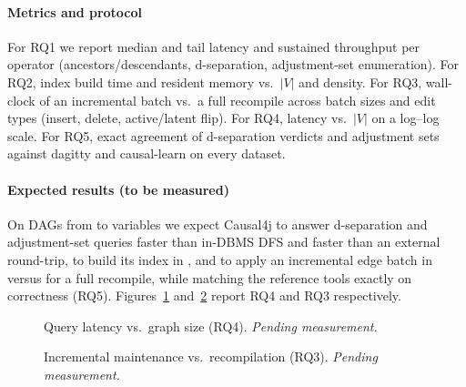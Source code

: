 \paragraph{Metrics and protocol}
For RQ1 we report median and tail latency and sustained throughput per operator
(ancestors/descendants, d-separation, adjustment-set enumeration). For RQ2, index
build time and resident memory vs.\ $|V|$ and density. For RQ3, wall-clock of an
incremental batch vs.\ a full recompile across batch sizes and edit types
(insert, delete, active/latent flip). For RQ4, latency vs.\ $|V|$ on a log--log
scale. For RQ5, exact agreement of d-separation verdicts and adjustment sets
against dagitty and causal-learn on every dataset. 

\paragraph{Expected results (to be measured)}
On DAGs from  to  variables we expect Causal4j
to answer d-separation and adjustment-set queries  faster than
in-DBMS DFS and  faster than an external round-trip, to build its
index in , and to apply an incremental edge batch in
 versus  for a full recompile, while matching the reference tools
exactly on correctness (RQ5). Figures~\ref{fig:latency} and~\ref{fig:incr} report
RQ4 and RQ3 respectively.

\begin{figure}[t]\centering
  \caption{Query latency vs.\ graph size (RQ4). \emph{Pending measurement.}}
  \label{fig:latency}
\end{figure}

\begin{figure}[t]\centering
  \caption{Incremental maintenance vs.\ recompilation (RQ3). \emph{Pending
  measurement.}}
  \label{fig:incr}
\end{figure}
